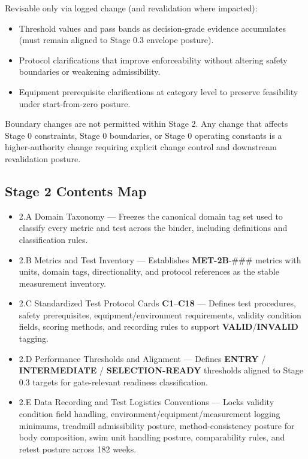 \documentclass[10pt]{article}
\begin{document}
Revisable only via logged change (and revalidation where impacted):

\begin{itemize}
\item Threshold values and pass bands as decision-grade evidence accumulates (must remain aligned to Stage 0.3 envelope posture).
\item Protocol clarifications that improve enforceability without altering safety boundaries or weakening admissibility.
\item Equipment prerequisite clarifications at category level to preserve feasibility under start-from-zero posture.
\end{itemize}

Boundary changes are not permitted within Stage 2. Any change that affects Stage 0 constraints, Stage 0 boundaries, or Stage 0 operating constants is a higher-authority change requiring explicit change control and downstream revalidation posture.
\newpage
\subsection*{Stage 2 Contents Map}
{}

\begin{itemize}
\item 2.A Domain Taxonomy — Freezes the canonical domain tag set used to classify every metric and test across the binder, including definitions and classification rules.
\item 2.B Metrics and Test Inventory — Establishes \textbf{MET-2B}-\#\#\# metrics with units, domain tags, directionality, and protocol references as the stable measurement inventory.
\item 2.C Standardized Test Protocol Cards \textbf{C1}–\textbf{C18} — Defines test procedures, safety prerequisites, equipment/environment requirements, validity condition fields, scoring methods, and recording rules to support \textbf{VALID}/\textbf{INVALID} tagging.
\item 2.D Performance Thresholds and Alignment — Defines \textbf{ENTRY} / \textbf{INTERMEDIATE} / \textbf{SELECTION-READY} thresholds aligned to Stage 0.3 targets for gate-relevant readiness classification.
\item 2.E Data Recording and Test Logistics Conventions — Locks validity condition field handling, environment/equipment/measurement logging minimums, treadmill admissibility posture, method-consistency posture for body composition, swim unit handling posture, comparability rules, and retest posture across 182 weeks.
\end{itemize}
\end{document}
